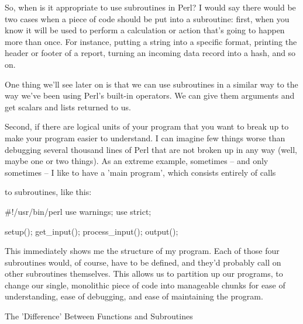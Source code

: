 \documentclass[a4paper,11pt]{book}
\begin{document}
\noindent 

\noindent So, when is it appropriate to use subroutines in Perl? I would say there would be two cases when a piece of code should be put into a subroutine: first, when you know it will be used to perform a calculation or action that's going to happen more than once. For instance, putting a string into a specific format, printing the header or footer of a report, turning an incoming data record into a hash, and so on.

\noindent 

\noindent One thing we'll see later on is that we can use subroutines in a similar way to the way we've been using Perl's built-in operators. We can give them arguments and get scalars and lists returned to us.

\noindent 

\noindent Second,  if there are logical units  of  your  program  that  you  want  to  break  up  to  make your  program easier to  understand.  I can imagine  few  things  worse  than  debugging  several  thousand  lines  of  Perl that are not  broken up  in any  way (well,  maybe  one  or  two  things).  As  an  extreme  example, sometimes -- and only  sometimes  --  I  like  to  have  a  'main  program',  which  consists  entirely  of  calls

\noindent to  subroutines,  like this:

\noindent 

\noindent \#!/usr/bin/perl use warnings; use strict;

\noindent 

\noindent setup(); get\_input(); process\_input(); output();

\noindent  

\noindent  

\noindent  

\noindent  

\noindent 

\noindent 

\noindent This  immediately shows me the structure of my program. Each of those four subroutines would, of course, have to be defined, and they'd probably call on other subroutines themselves. This allows us to partition up our programs, to change our single, monolithic piece of code into manageable chunks for ease of understanding, ease of debugging, and ease of maintaining the program.

\noindent 

\noindent The 'Difference' Between Functions and Subroutines
\end{document}
